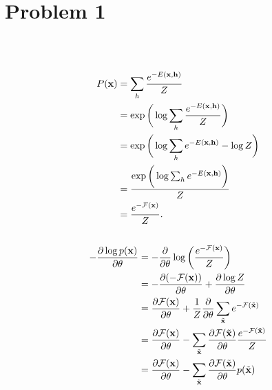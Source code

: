 \section{Problem 1}~\label{sec:prob1}

\subsection{} %

\begin{equation}
\begin{split}
    P({\mathbf{x}})
        &= \sum_h \frac{e^{-E({\mathbf{x}},{\mathbf{h}})}}{Z} \\
        &= \exp\bigg(\log\sum_h\frac{e^{-E({\mathbf{x}},{\mathbf{h}})}}{Z}\bigg) \\
        &= \exp\bigg(\log\sum_h e^{-E({\mathbf{x}},{\mathbf{h}})} - \log Z\bigg) \\
        &= \frac{\exp\bigg(\log\sum_h e^{-E({\mathbf{x}},{\mathbf{h}})}\bigg)}{Z} \\
        &= \frac{e^{-{\mathcal{F}}({\mathbf{x}})}}{Z}. \\
\end{split}
\end{equation}

\subsection{} %

\begin{equation}
\begin{split}
    -\frac{\partial\log p({\mathbf{x}})}{\partial\theta}
        &= -\frac{\partial}{\partial\theta}\log\bigg(\frac{e^{-{\mathcal{F}}({\mathbf{x}})}}{Z}\bigg) \\
        &= -\frac{\partial(-{\mathcal{F}}({\mathbf{x}}))}{\partial\theta} + \frac{\partial \log Z}{\partial\theta} \\
        &= \frac{\partial {\mathcal{F}}({\mathbf{x}})}{\partial\theta} + \frac{1}{Z}\frac{\partial}{\partial\theta} \sum_{\tilde{{\mathbf{x}}}} e^{-{\mathcal{F}}(\tilde{{\mathbf{x}}})}\\
        &= \frac{\partial {\mathcal{F}}({\mathbf{x}})}{\partial\theta} - \sum_{\tilde{{\mathbf{x}}}} \frac{\partial{\mathcal{F}}(\tilde{{\mathbf{x}}})}{\partial\theta}\frac{e^{-{\mathcal{F}}(\tilde{{\mathbf{x}}})}}{Z}\\
        &= \frac{\partial {\mathcal{F}}({\mathbf{x}})}{\partial\theta} - \sum_{\tilde{{\mathbf{x}}}} \frac{\partial{\mathcal{F}}(\tilde{{\mathbf{x}}})}{\partial\theta}p(\tilde{{\mathbf{x}}})\\
\end{split}
\end{equation}

\subsection{} %
